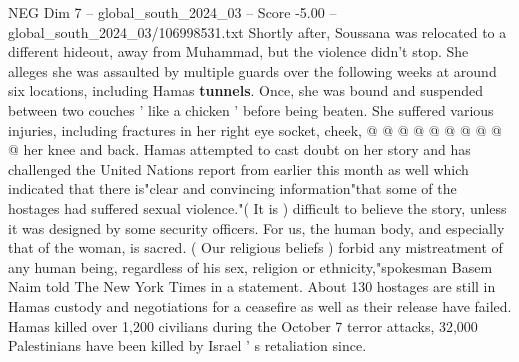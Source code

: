 \begin{textsample}{NEG Dim 7 – global\_south\_2024\_03 – Score -5.00 – global\_south\_2024\_03/106998531.txt}
Shortly after, Soussana was relocated to a different hideout, away from Muhammad, but the violence didn't stop.
She alleges she was assaulted by multiple guards over the following weeks at around six locations, including Hamas \textbf{tunnels}.
Once, she was bound and suspended between two couches ' like a chicken ' before being beaten.
She suffered various injuries, including fractures in her right eye socket, cheek, @ @ @ @ @ @ @ @ @ @ her knee and back.
Hamas attempted to cast doubt on her story and has challenged the United Nations report from earlier this month as well which indicated that there is"clear and convincing information"that some of the hostages had suffered sexual violence."( It is ) difficult to believe the story, unless it was designed by some security officers.
For us, the human body, and especially that of the woman, is sacred. ( Our religious beliefs ) forbid any mistreatment of any human being, regardless of his sex, religion or ethnicity,"spokesman Basem Naim told The New York Times in a statement.
About 130 hostages are still in Hamas custody and negotiations for a ceasefire as well as their release have failed.
Hamas killed over 1,200 civilians during the October 7 terror attacks, 32,000 Palestinians have been killed by Israel ' s retaliation since.

\end{textsample}
